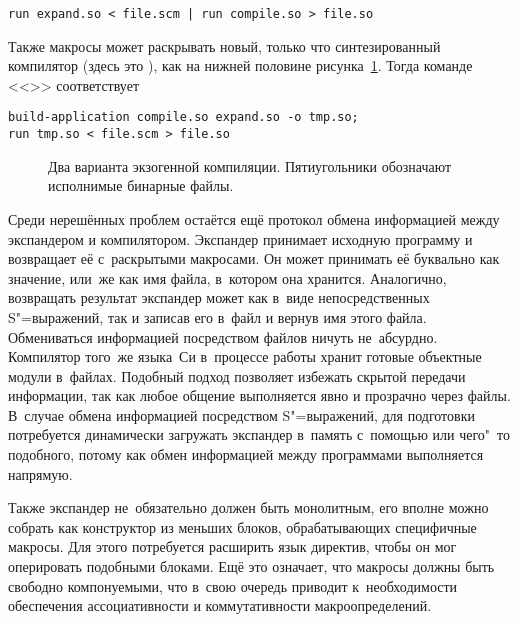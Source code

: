 \begin{lstlisting}
run expand.so < file.scm | run compile.so > file.so
\end{lstlisting}

Также макросы может раскрывать новый, только что синтезированный компилятор
(здесь это ), как на нижней половине
рисунка~\ref{macros/expand/exo/pic:subj}. Тогда команде <<>> соответствует

\begin{lstlisting}
build-application compile.so expand.so -o tmp.so;
run tmp.so < file.scm > file.so
\end{lstlisting}

\begin{figure}\centering

\caption{Два варианта экзогенной компиляции. Пятиугольники обозначают исполнимые
бинарные файлы.}%
\label{macros/expand/exo/pic:subj}
\end{figure}

Среди нерешённых проблем остаётся ещё протокол обмена информацией между
экспандером и компилятором. Экспандер принимает исходную программу и возвращает
её с~раскрытыми макросами. Он может принимать её буквально как значение, или~же
как имя файла, в~котором она хранится. Аналогично, возвращать результат
экспандер может как в~виде непосредственных S"=выражений, так и записав его
в~файл и вернув имя этого файла. Обмениваться информацией посредством файлов
ничуть не~абсурдно. Компилятор того~же языка~Си в~процессе работы хранит готовые
объектные модули в~файлах. Подобный подход позволяет избежать скрытой передачи
информации, так как любое общение выполняется явно и прозрачно через файлы.
В~случае обмена информацией посредством S"=выражений, для подготовки потребуется
динамически загружать экспандер в~память с~помощью  или чего"~то
подобного, потому как обмен информацией между программами выполняется напрямую.

Также экспандер не~обязательно должен быть монолитным, его вполне можно собрать
как конструктор из меньших блоков, обрабатывающих специфичные макросы. Для этого
потребуется расширить язык директив, чтобы он мог оперировать подобными блоками.
Ещё это означает, что макросы должны быть свободно компонуемыми, что в~свою
очередь приводит к~необходимости обеспечения ассоциативности и коммутативности
макроопределений.

